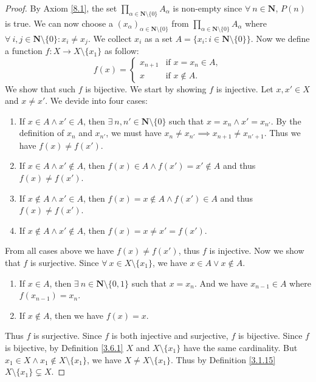 \begin{proof}
    By Axiom \ref{8.1}, the set \(\prod_{\alpha \in \mathbf{N} \setminus \{0\}} A_{\alpha}\) is non-empty since \(\forall\ n \in \mathbf{N}\), \(P(n)\) is true.
    We can now choose a \((x_{\alpha})_{\alpha \in \mathbf{N} \setminus \{0\}}\) from \(\prod_{\alpha \in \mathbf{N} \setminus \{0\}} A_{\alpha}\) where \(\forall\ i, j \in \mathbf{N} \setminus \{0\} : x_i \neq x_j\).
    We collect \(x_i\) as a set \(A = \{x_i : i \in \mathbf{N} \setminus \{0\}\}\).
    Now we define a function \(f : X \to X \setminus \{x_1\}\) as follow:
    \[
        f(x) = \begin{cases}
            x_{n + 1} & \text{if } x = x_n \in A, \\
            x         & \text{if } x \notin A.
        \end{cases}
    \]
    We show that such \(f\) is bijective.
    We start by showing \(f\) is injective.
    Let \(x, x' \in X\) and \(x \neq x'\).
    We devide into four cases:
    \begin{enumerate}
        \item If \(x \in A \land x' \in A\), then \(\exists\ n, n' \in \mathbf{N} \setminus \{0\}\) such that \(x = x_n \land x' = x_{n'}\).
              By the definition of \(x_n\) and \(x_{n'}\), we must have \(x_n \neq x_{n'} \implies x_{n + 1} \neq x_{n' + 1}\).
              Thus we have \(f(x) \neq f(x')\).
        \item If \(x \in A \land x' \notin A\), then \(f(x) \in A \land f(x') = x' \notin A\) and thus \(f(x) \neq f(x')\).
        \item If \(x \notin A \land x' \in A\), then \(f(x) = x \notin A \land f(x') \in A\) and thus \(f(x) \neq f(x')\).
        \item If \(x \notin A \land x' \notin A\), then \(f(x) = x \neq x' = f(x')\).
    \end{enumerate}
    From all cases above we have \(f(x) \neq f(x')\), thus \(f\) is injective.
    Now we show that \(f\) is surjective.
    Since \(\forall\ x \in X \setminus \{x_1\}\), we have \(x \in A \lor x \notin A\).
    \begin{enumerate}
        \item If \(x \in A\), then \(\exists\ n \in \mathbf{N} \setminus \{0, 1\}\) such that \(x = x_n\).
              And we have \(x_{n - 1} \in A\) where \(f(x_{n - 1}) = x_n\).
        \item If \(x \notin A\), then we have \(f(x) = x\).
    \end{enumerate}
    Thus \(f\) is surjective.
    Since \(f\) is both injective and surjective, \(f\) is bijective.
    Since \(f\) is bijective, by Definition \ref{3.6.1} \(X\) and \(X \setminus \{x_1\}\) have the same cardinality.
    But \(x_1 \in X \land x_1 \notin X \setminus \{x_1\}\), we have \(X \neq X \setminus \{x_1\}\).
    Thus by Definition \ref{3.1.15} \(X \setminus \{x_1\} \subsetneq X\).


\end{proof}
